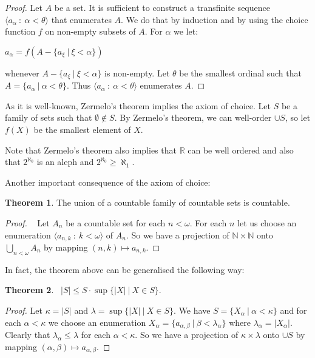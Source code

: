 \documentclass[8pt]{article}
\theoremstyle{definition}
\theoremstyle{definition}
\newtheorem{theorem}{Theorem}[section]
\theoremstyle{definition}
\theoremstyle{definition}
\theoremstyle{definition}
\theoremstyle{definition}
\theoremstyle{definition}
\theoremstyle{definition}
\theoremstyle{definition}
\theoremstyle{definition}
\theoremstyle{definition}
\theoremstyle{definition}
\theoremstyle{definition}
\theoremstyle{definition}
\theoremstyle{question}
\begin{document}
\begin{proof}
  Let $A$ be a set. It is sufficient to construct a transfinite sequence 
  $\langle a_{\alpha} \: : \: \alpha < \theta \rangle$ that enumerates $A$. We do that by induction and by using
  the choice function $f$ on non-empty subsets of $A$. For $\alpha$ we let:
  \begin{center}
    $a_{\alpha} = f (A - \{ a_{\xi} \: | \: \xi < \alpha \})$
  \end{center}
  whenever $A - \{ a_{\xi} \: | \: \xi < \alpha \}$ is non-empty. 
  Let $\theta$ be the smallest ordinal such that $A = \{ a_{\alpha} \: | \: \alpha < \theta \}$.
  Thus $\langle a_{\alpha} \: : \: \alpha < \theta \rangle$ enumerates $A$.
\end{proof}

As it is well-known, Zermelo's theorem implies the axiom of choice.
Let $S$ be a family of sets such that $\emptyset \notin S$.
By Zermelo's theorem, we can well-order $\cup S$, so let $f(X)$ be the smallest element of $X$.

Note that Zermelo's theorem also implies that $\mathbb{R}$ can be well ordered and also that $2^{\aleph_0}$ is an aleph
and $2^{\aleph_0} \geq \aleph_1$.

Another important consequence of the axiom of choice:
\begin{theorem}
  The union of a countable family of countable sets is countable.
\end{theorem}

\begin{proof}~\label{countableunion}
  Let $A_n$ be a countable set for each $n < \omega$. For each $n$ let us choose an enumeration 
  $\langle a_{n, k} \: : \: k < \omega \rangle$ of $A_n$. So we have a projection of $\mathbb{N} \times \mathbb{N}$ onto
  $\bigcup \limits_{n < \omega} A_n$ by mapping $(n, k) \mapsto a_{n,k}$.
\end{proof}

In fact, the theorem above can be generalised the following way:
\begin{theorem}~\label{union}
  $|S| \leq S \cdot \sup \{ |X| \: | \: X \in S \}$.
\end{theorem}

\begin{proof}
  Let $\kappa = |S|$ and $\lambda = \sup \{ |X| \: | \: X \in S \}$.
  We have $S = \{ X_{\alpha} \: | \: \alpha < \kappa \}$ and for each $\alpha < \kappa$ we choose an 
  enumeration $X_{\alpha} = \{ a_{\alpha, \beta} \: | \: \beta < \lambda_{\alpha} \}$ where $\lambda_{\alpha} = |X_{\alpha}|$.
  Clearly that $\lambda_{\alpha} \leq \lambda$ for each $\alpha < \kappa$.
  So we have a projection of $\kappa \times \lambda$ onto $\cup S$ by mapping $(\alpha, \beta) \mapsto a_{\alpha, \beta}$.
\end{proof}
\end{document}
